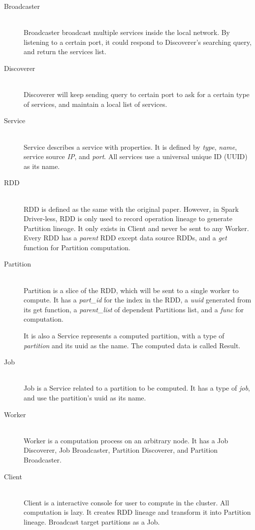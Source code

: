 \begin{description}
    \item[Broadcaster] \hfill \\
    Broadcaster broadcast multiple services inside the local network.
    By listening to a certain port, it could respond to Discoverer's searching query, and return the services list.

    \item[Discoverer] \hfill \\
    Discoverer will keep sending query to certain port to ask for a certain type of services,
    and maintain a local list of services.

    \item[Service] \hfill \\
    Service describes a service with properties.
    It is defined by \emph{type}, \emph{name}, service source \emph{IP}, and \emph{port}.
    All services use a universal unique ID (UUID) as its name.

    \item[RDD] \hfill \\
    RDD is defined as the same with the original paper.
    However, in Spark Driver-less, RDD is only used to record operation lineage to generate Partition lineage.
    It only exists in Client and never be sent to any Worker.
    Every RDD has a \emph{parent} RDD except data source RDDs, and a \emph{get} function for Partition computation.

    \item[Partition] \hfill \\
    Partition is a slice of the RDD, which will be sent to a single worker to compute.
    It has a \emph{part\_id} for the index in the RDD,
    a \emph{uuid} generated from its get function,
    a \emph{parent\_list} of dependent Partitions list,
    and a \emph{func} for computation.

    It is also a Service represents a computed partition,
    with a type of \textit{partition} and its uuid as the name.
    The computed data is called Result.

    \item[Job] \hfill \\
    Job is a Service related to a partition to be computed.
    It has a type of \textit{job}, and use the partition's uuid as its name.

    \item[Worker] \hfill \\
    Worker is a computation process on an arbitrary node.
    It has a Job Discoverer, Job Broadcaster, Partition Discoverer, and Partition Broadcaster.

    \item[Client] \hfill \\
    Client is a interactive console for user to compute in the cluster.
    All computation is lazy.
    It creates RDD lineage and transform it into Partition lineage.
    Broadcast target partitions as a Job.
\end{description}

